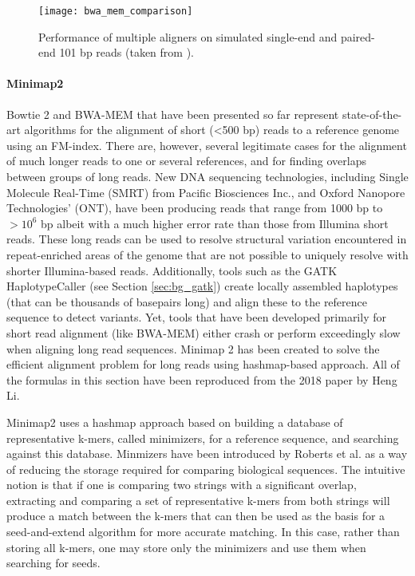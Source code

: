 \begin{figure}[h!]
    \texttt{[image: bwa\_mem\_comparison]}
    \centering
    \caption {Performance of multiple aligners on simulated single-end and paired-end 101 bp reads (taken from \autocite{li2013aligning}).}
    \label{fig:bwa_mem_comparison}
\end{figure}

\paragraph{Minimap2}

Bowtie 2 and BWA-MEM that have been presented so far represent state-of-the-art algorithms for the alignment of short (<500 bp) reads to a reference genome using an FM-index. There are, however, several legitimate cases for the alignment of much longer reads to one or several references, and for finding overlaps between groups of long reads. New DNA sequencing technologies, including Single Molecule Real-Time (SMRT)\autocite{rhoads2015pacbio} from Pacific Biosciences Inc., and Oxford Nanopore Technologies' (ONT)\autocite{lu2016oxford}, have been producing reads that range from 1000 bp to $>10^6$ bp albeit with a much higher error rate than those from Illumina short reads. These long reads can be used to resolve structural variation encountered in repeat-enriched areas of the genome that are not possible to uniquely resolve with shorter Illumina-based reads\autocite{roberts2013advantages}. Additionally, tools such as the GATK HaplotypeCaller (see Section \ref{sec:bg_gatk}) create locally assembled haplotypes (that can be thousands of basepairs long) and align these to the reference sequence to detect variants. Yet, tools that have been developed primarily for short read alignment (like BWA-MEM) either crash or perform exceedingly slow when aligning long read sequences. Minimap 2\autocite{li2018minimap2} has been created to solve the efficient alignment problem for long reads using hashmap-based approach. All of the formulas in this section have been reproduced from the 2018 paper by Heng Li\autocite{li2018minimap2}.

Minimap2 uses a hashmap approach based on building a database of representative k-mers, called minimizers, for a reference sequence, and searching against this database. Minmizers have been introduced by Roberts et al.\autocite{roberts2004reducing} as a way of reducing the storage required for comparing biological sequences. The intuitive notion is that if one is comparing two strings with a significant overlap, extracting and comparing a set of representative k-mers from both strings will produce a match between the k-mers that can then be used as the basis for a seed-and-extend algorithm for more accurate matching. In this case, rather than storing all k-mers, one may store only the minimizers and use them when searching for seeds.

